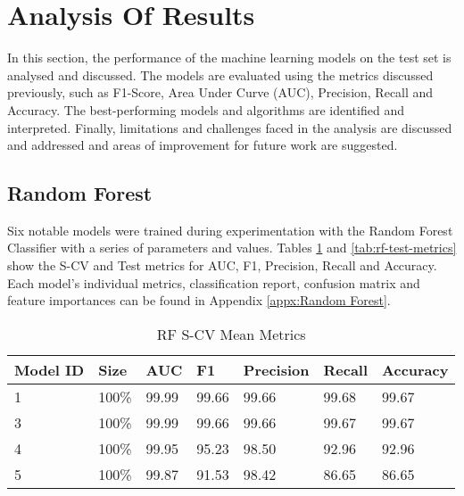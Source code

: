 
\section{Analysis Of Results}
 \label{sec: Analysis Of Results}


In this section, the performance of the machine learning models on the test set is analysed and discussed. The models are evaluated using the metrics discussed previously, such as F1-Score, Area Under Curve (AUC), Precision, Recall and Accuracy. The best-performing models and algorithms are identified and interpreted. Finally, limitations and challenges faced in the analysis are discussed and addressed and areas of improvement for future work are suggested.


\subsection{Random Forest}

Six notable models were trained during experimentation with the Random Forest Classifier with a series of parameters and values. Tables \ref{tab:rf-scv-metrics} and \ref{tab:rf-test-metrics} show the S-CV and Test metrics for AUC, F1, Precision, Recall and Accuracy. Each model's individual metrics, classification report, confusion matrix and feature importances can be found in Appendix \ref{appx:Random Forest}.
 
\begin{table}[H]
\centering
\caption{RF S-CV Mean Metrics}
\label{tab:rf-scv-metrics}
\begin{tabular}{|l|l|l|l|l|l|l|}
\hline
\textbf{Model ID} & \textbf{Size} & \textbf{AUC} & \textbf{F1} & \textbf{Precision} & \textbf{Recall} & \textbf{Accuracy}  \\ \hline
1 & 100\% & 99.99 & 99.66 & 99.66 & 99.68 & 99.67 \\ \hline
3 & 100\% & 99.99 & 99.66 & 99.66 & 	99.67 &	99.67 \\ \hline
4 & 100\% & 99.95 & 95.23 &	98.50 &	92.96 &	92.96 \\ \hline
5 & 100\% & 99.87 &	91.53 &	98.42 &	86.65 &	86.65 \\ \hline
\end{tabular}
\end{table}

